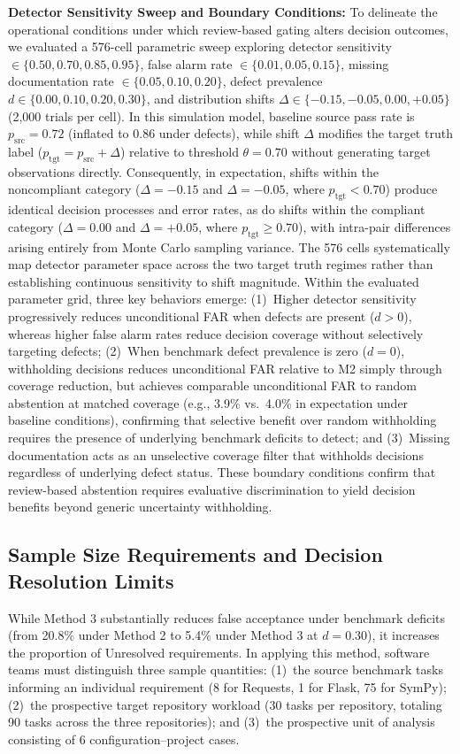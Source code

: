 \documentclass[runningheads]{llncs}
\begin{document}
\textbf{Detector Sensitivity Sweep and Boundary Conditions:} To delineate the operational conditions under which review-based gating alters decision outcomes, we evaluated a 576-cell parametric sweep exploring detector sensitivity $\in \{0.50, 0.70, 0.85, 0.95\}$, false alarm rate $\in \{0.01, 0.05, 0.15\}$, missing documentation rate $\in \{0.05, 0.10, 0.20\}$, defect prevalence $d \in \{0.00, 0.10, 0.20, 0.30\}$, and distribution shifts $\Delta \in \{-0.15, -0.05, 0.00, +0.05\}$ (2,000 trials per cell). In this simulation model, baseline source pass rate is $p_{\text{src}} = 0.72$ (inflated to $0.86$ under defects), while shift $\Delta$ modifies the target truth label ($p_{\text{tgt}} = p_{\text{src}} + \Delta$) relative to threshold $\theta = 0.70$ without generating target observations directly. Consequently, in expectation, shifts within the noncompliant category ($\Delta = -0.15$ and $\Delta = -0.05$, where $p_{\text{tgt}} < 0.70$) produce identical decision processes and error rates, as do shifts within the compliant category ($\Delta = 0.00$ and $\Delta = +0.05$, where $p_{\text{tgt}} \ge 0.70$), with intra-pair differences arising entirely from Monte Carlo sampling variance. The 576 cells systematically map detector parameter space across the two target truth regimes rather than establishing continuous sensitivity to shift magnitude. Within the evaluated parameter grid, three key behaviors emerge: (1)~Higher detector sensitivity progressively reduces unconditional FAR when defects are present ($d > 0$), whereas higher false alarm rates reduce decision coverage without selectively targeting defects; (2)~When benchmark defect prevalence is zero ($d = 0$), withholding decisions reduces unconditional FAR relative to M2 simply through coverage reduction, but achieves comparable unconditional FAR to random abstention at matched coverage (e.g., 3.9\% vs.\ 4.0\% in expectation under baseline conditions), confirming that selective benefit over random withholding requires the presence of underlying benchmark deficits to detect; and (3)~Missing documentation acts as an unselective coverage filter that withholds decisions regardless of underlying defect status. These boundary conditions confirm that review-based abstention requires evaluative discrimination to yield decision benefits beyond generic uncertainty withholding.

\subsection{Sample Size Requirements and Decision Resolution Limits}
While Method 3 substantially reduces false acceptance under benchmark deficits (from 20.8\% under Method 2 to 5.4\% under Method 3 at $d = 0.30$), it increases the proportion of Unresolved requirements. In applying this method, software teams must distinguish three sample quantities: (1)~the source benchmark tasks informing an individual requirement (8 for Requests, 1 for Flask, 75 for SymPy); (2)~the prospective target repository workload (30 tasks per repository, totaling 90 tasks across the three repositories); and (3)~the prospective unit of analysis consisting of 6 configuration--project cases.
\end{document}
